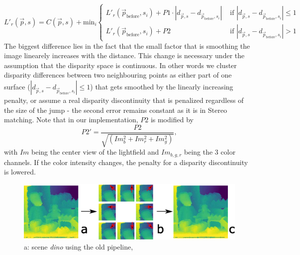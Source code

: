 \documentclass  [
  paper    = a4,
  BCOR     = 10mm,
  twoside,
  fontsize = 12pt,
  fleqn,
  toc      = bibnumbered,
  toc      = listofnumbered,
  numbers  = noendperiod,
  headings = normal,
  listof   = leveldown,
  version  = 3.03
]                                       {scrreprt}
\begin{document}
\begin{equation}\label{eq:recursive1d}
L'_r(\vec{p}, s) = C(\vec{p}, s) + \text{min}_i
\begin{cases}
L'_r(\vec{p}_\text{before}, s_i)+P1 \cdot |d_{\vec p, s} - d_{\vec{p}_\text{before}, s_i}|  & \text{ if }|d_{\vec p, s} - d_{\vec{p}_\text{before}, s_i}| \leq 1 \\
L'_r(\vec{p}_\text{before}, s_i)+P2 & \text{ if }|d_{\vec p, s} - d_{\vec{p}_\text{before}, s_i}| > 1
\end{cases}
\end{equation} 
The biggest difference lies in the fact that the small factor that is smoothing the image linearely increases with the distance. This change is necessary under the assumption that the disparity space is continuous. In other words we cluster disparity differences between two neighbouring points as either part of one surface ($|d_{\vec p, s} - d_{\vec{p}_\text{before}, s_i}| \leq 1$) that gets smoothed by the linearly increasing penalty, or assume a real disparity discontinuity that is penalized regardless of the size of the jump - the second error remains constant as it is in Stereo matching. Note that in our implementation, $P2$ is modified by 
\begin{equation}\label{eq:gradientp2}
P2' =  \frac{P2}{\sqrt{(Im_b^2 +Im_r^2 + Im_g^2)}},
\end{equation}
with $Im$ being the center view of the lightfield and $Im_{b,g,r}$ being the 3 color channels. If the color intensity changes, the penalty for a disparity discontinuity is lowered.

\begin{figure}
	\centering
	\includegraphics[width=1\linewidth]{images/subplot_sgm}
	\caption[SGM from different directions]{a: scene \textit{dino} using the old pipeline,}
	\label{fig:subplotsgm}
\end{figure}
\end{document}
